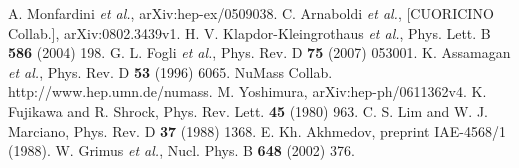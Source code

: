 \begin{thebibliography}{99}
A. Monfardini \textit{et al.}, arXiv:hep-ex/0509038.
C. Arnaboldi \textit{et al.}, [CUORICINO Collab.], arXiv:0802.3439v1.
H. V. Klapdor-Kleingrothaus \textit{et al.}, Phys. Lett. B \textbf{586} (2004) 198.
G. L. Fogli \textit{et al.}, Phys. Rev. D \textbf{75} (2007) 053001.
K. Assamagan \textit{et al.}, Phys. Rev. D \textbf{53} (1996) 6065.
NuMass Collab. http://www.hep.umn.de/numass.
 M. Yoshimura, arXiv:hep-ph/0611362v4.
 K. Fujikawa and R. Shrock, Phys. Rev. Lett. \textbf{45} (1980) 963.
C. S. Lim and W. J. Marciano, Phys. Rev. D \textbf{37} (1988) 1368.
E. Kh. Akhmedov, preprint IAE-4568/1 (1988).
W. Grimus \textit{et al.}, Nucl. Phys. B \textbf{648} (2002) 376.


\end{thebibliography}
